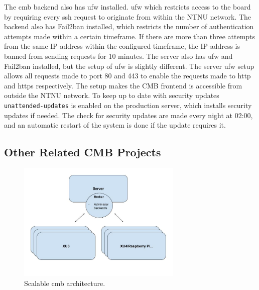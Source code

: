 The \gls{cmb} backend also has \gls{ufw} \cite{UFW} installed. \gls{ufw} which restricts access to the board by requiring every \gls{ssh} request to originate from within the NTNU network. The backend also has Fail2ban  \cite{FAIL2BAN} installed, which restricts the number of authentication attempts made within a certain timeframe. If there are more than three attempts from the same IP-address within the configured timeframe, the IP-address is banned from sending requests for 10 minutes. The server also has \gls{ufw} and Fail2ban installed, but the setup of \gls{ufw} is slightly different. The server \gls{ufw} setup allows all requests made to port 80 and 443 to enable the requests made to \gls{http} and \gls{https} respectively. The setup makes the CMB frontend is accessible from outside the NTNU network. To keep up to date with security updates \texttt{unattended-updates} \cite{UNATTENDED} is enabled on the production server, which installs security updates if needed. The check for security updates are made every night at 02:00, and an automatic restart of the system is done if the update requires it.


\subsection{Other Related CMB Projects}
\label{subsec:related-proj}
\begin{figure}[ct!]
  \centering
  \includegraphics[width=0.7\textwidth]{figs/cmb_scale_arch.jpg}
  \caption[Scalable \gls{cmb} architecture.]{Scalable \gls{cmb} architecture.}
  \label{fig:cmb-scale-arch}
\end{figure}

